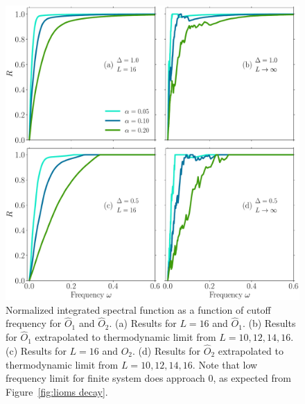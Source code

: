 \begin{figure}[ht]
  \centering
  \includegraphics[width=\figsize\textwidth]{Figures/O12_no_scaling.pdf}
  \caption{Normalized integrated spectral function as a function of cutoff frequency for
  \(\hat{O}_1\) and \(\hat{O}_2\).
  (a) Results for \(L=16\) and \(\hat{O}_1\).  (b) Results for \(\hat{O}_1\) extrapolated to
  thermodynamic limit from \(L=10,12,14,16\). (c) Results for \(L=16\) and \(\hat{O}_2\). 
  (d) Results for \(\hat{O}_2\) extrapolated to thermodynamic limit from \(L=10,12,14,16\).
  Note that low frequency limit for finite system does approach \(0\), as expected from 
  Figure~\ref{fig:lioms decay}.
  }\label{fig:O12 no scaling}
\end{figure}
